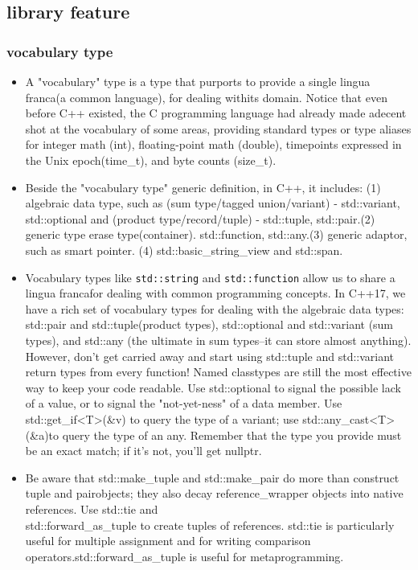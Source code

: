 \documentclass[a4paper,11pt,twoside]{book}
\begin{document}
\subsection{library feature}
\subsubsection{vocabulary type}
\begin{itemize}

    \item A "vocabulary" type is a type that purports to provide a single lingua franca(a common language), for dealing withits domain. Notice that even before C++ existed, the C programming language had already made adecent shot at the vocabulary of some areas, providing standard types or type aliases for integer math (int), floating-point math (double), timepoints expressed in the Unix epoch(time\_t), and byte counts (size\_t).

    \item Beside the "vocabulary type" generic definition, in C++, it includes: (1) algebraic data type, such as (sum type/tagged union/variant) - std::variant, std::optional and (product type/record/tuple) - std::tuple, std::pair.(2) generic type erase type(container). std::function, std::any.(3) generic adaptor, such as smart pointer. (4) std::basic\_string\_view and std::span.


    \item Vocabulary types like \texttt{std::string} and \texttt{std::function} allow us to share a lingua francafor dealing with common programming concepts. In C++17, we have a rich set of vocabulary types for dealing with the algebraic data types: std::pair and std::tuple(product types), std::optional and std::variant (sum types), and std::any (the ultimate in sum types--it can store almost anything). However, don't get carried away and start using std::tuple and std::variant return types from every function! Named classtypes are still the most effective way to keep your code readable. Use std::optional to signal the possible lack of a value, or to signal the "not-yet-ness" of a data member. Use std::get\_if<T>(\&v) to query the type of a variant; use std::any\_cast<T>(\&a)to query the type of an any. Remember that the type you provide must be an exact match; if it's not, you'll get nullptr.

    \item Be aware that std::make\_tuple and std::make\_pair do more than construct tuple and pairobjects; they also decay reference\_wrapper objects into native references. Use std::tie and \\ std::forward\_as\_tuple to create tuples of references. std::tie is particularly useful for multiple assignment and for writing comparison operators.std::forward\_as\_tuple is useful for metaprogramming.


\end{itemize}
\end{document}
